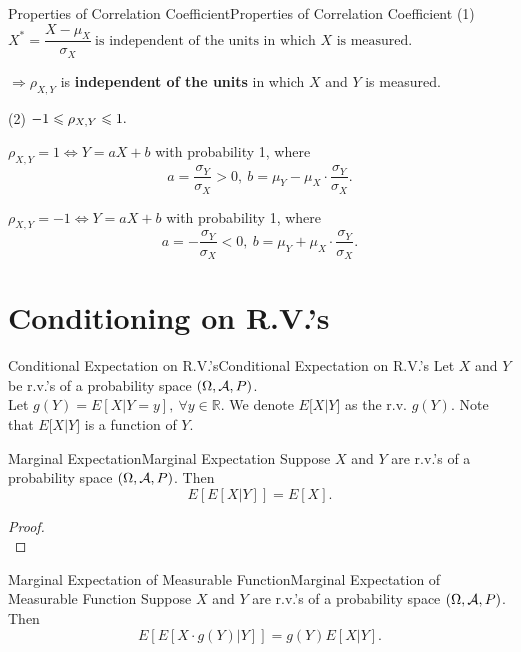 \documentclass{elegantbook}
\begin{document}
\begin{remark}{Properties of Correlation Coef\/f\/icient}{Properties of Correlation Coefficient}
(1)
\(X^{*} = \dfrac{X - \mu_{X}}{\sigma_{X}}\ \mathrm{\text{is\ independent\ of\ the\ units\ in\ which\ }}X\mathrm{\text{\ is\ measured}}.\)
\vspace{0.1cm}

\(\Rightarrow \rho_{X,Y}\) is \textbf{independent of the units} in which
\(X\) and \(Y\) is measured.

(2) \(- 1 \leqslant \rho_{X,Y} \leqslant 1.\)

\(\rho_{X,Y} = 1 \Leftrightarrow Y = aX + b\) with probability 1, where
\[a = \frac{\sigma_{Y}}{\sigma_{X}} > 0,\ b = \mu_{Y} - \mu_{X} \cdot \frac{\sigma_{Y}}{\sigma_{X}}.\]

\(\rho_{X,Y} =- 1 \Leftrightarrow Y = aX + b\) with probability 1, where
\[a = - \frac{\sigma_{Y}}{\sigma_{X}} < 0,\ b = \mu_{Y} + \mu_{X} \cdot \frac{\sigma_{Y}}{\sigma_{X}}.\]
\end{remark}

\section{Conditioning on R.V.'s}

\begin{definition}{Conditional Expectation on R.V.'s}{Conditional Expectation on R.V.'s}
Let \(X\) and \(Y\) be r.v.'s of a probability space $(\Omega,\mathcal{A}, P)$.\\
 Let \(g(Y) = E[X | Y = y],\ \forall y\mathbb{\in R}\). We denote \(E\lbrack X|Y\rbrack\) as the r.v. \(g(Y)\). Note that \(E\lbrack X|Y\rbrack\) is a function of \(Y\).
\end{definition}

\begin{theorem}{Marginal Expectation}{Marginal Expectation}
Suppose \(X\) and \(Y\) are r.v.'s of a probability space $(\Omega,\mathcal{A}, P)$. Then
\[E\left\lbrack E\left\lbrack X | Y \right\rbrack \right\rbrack = E[X].\]
\vspace{0.01cm}
\end{theorem}

\begin{proof}
\\[4cm]\vspace{0.01cm}
\end{proof}

\begin{theorem}{Marginal Expectation of Measurable Function}{Marginal Expectation of Measurable Function}
Suppose \(X\) and \(Y\) are r.v.'s of a probability space $(\Omega,\mathcal{A}, P)$. Then
\[E\left\lbrack E\left\lbrack X \cdot g(Y) | Y \right\rbrack \right\rbrack = g( Y )E\left\lbrack X|Y \right\rbrack.\]
\vspace{0.01cm}
\end{theorem}
\end{document}
